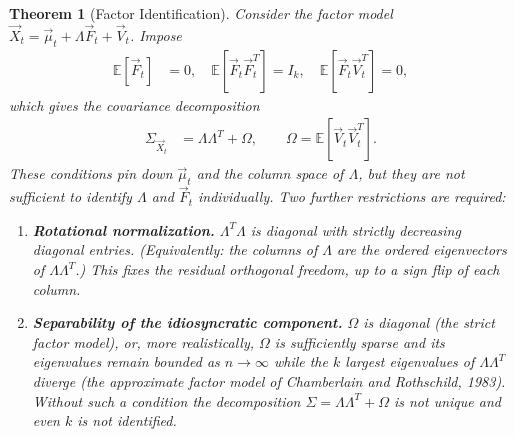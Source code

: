 \documentclass[11pt]{article}
\theoremstyle{definition}
\theoremstyle{plain}
\newtheorem{theorem}{Theorem}[section]
\theoremstyle{remark}
\begin{document}
\begin{theorem}[Factor Identification]
    Consider the factor model $\vec{X}_t = \vec{\mu}_t + \Lambda \vec{F}_t + \vec{V}_t$. Impose
    \begin{align}
        \mathbb{E}[\vec{F}_t] &= 0, \quad \mathbb{E}[\vec{F}_t \vec{F}_t^T]= I_k, \quad \mathbb{E}[\vec{F}_t \vec{V}_t^T]=0,
    \end{align}
    which gives the covariance decomposition
    \begin{align}
        \Sigma_{\vec{X}_t} &= \Lambda \Lambda^T + \Omega, \qquad \Omega = \mathbb{E}[\vec{V}_t \vec{V}_t^T].
    \end{align}
    These conditions pin down $\vec{\mu}_t$ and the \emph{column space} of $\Lambda$, but they are \emph{not} sufficient to identify $\Lambda$ and $\vec{F}_t$ individually. Two further restrictions are required:
    \begin{enumerate}[noitemsep]
        \item \textbf{Rotational normalization.} $\Lambda^T\Lambda$ is diagonal with strictly decreasing diagonal entries. (Equivalently: the columns of $\Lambda$ are the ordered eigenvectors of $\Lambda\Lambda^T$.) This fixes the residual orthogonal freedom, up to a sign flip of each column.
        \item \textbf{Separability of the idiosyncratic component.} $\Omega$ is diagonal (the \emph{strict} factor model), or, more realistically, $\Omega$ is sufficiently sparse and its eigenvalues remain bounded as $n \to \infty$ while the $k$ largest eigenvalues of $\Lambda\Lambda^T$ diverge (the \emph{approximate} factor model of Chamberlain and Rothschild, 1983). Without such a condition the decomposition $\Sigma = \Lambda\Lambda^T + \Omega$ is not unique and even $k$ is not identified.
    \end{enumerate}
\end{theorem}
\end{document}
